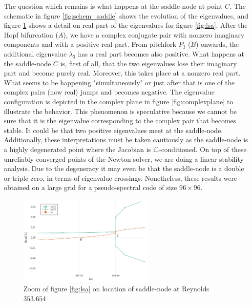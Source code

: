 The question which remains is what happens at the saddle-node at point $C$. The
schematic in figure \ref{fig:schem_saddle} shows the evolution of the
eigenvalues, and figure \ref{fig:lsa_zoom} shows a detail on real part of the
eigenvalues for figure \ref{fig:lsa}. After the Hopf bifurcation ($A$), we have
a complex conjugate pair with nonzero imaginary components and with a positive
real part. From pitchfork $P_3$ ($B$) onwards, the additional eigenvalue
$\lambda_3$ has a real part becomes also positive. What happens at the
saddle-node $C$ is, first of all, that the two eigenvalues lose their imaginary
part and become purely real. Moreover, this takes place at a nonzero real part.
What seems to be happening "simultaneously" or just after that is one of the
complex pairs (now real) jumps and becomes negative. The eigenvalue
configuration is depicted in the complex plane in figure \ref{fig:complexplane}
to illustrate the behavior. This phenomenon is speculative because we cannot be
sure that it is the eigenvalue corresponding to the complex pair that becomes
stable. It could be that two positive eigenvalues meet at the saddle-node.
Additionally, these interpretations must be taken cautiously as the saddle-node
is a highly degenerated point where the Jacobian is ill-conditioned. On top of
these unreliably converged points of the Newton solver, we are doing a linear
stability analysis. Due to the degeneracy it may even be that the saddle-node
is a double or triple zero, in terms of eigenvalue crossings. Nonetheless,
these results were obtained on a large grid for a pseudo-spectral code of size
$96 \times 96$.


\begin{figure}[h!]
  \centering
  \includegraphics[width=0.6\textwidth]{figs/lsa_sn_zoom96x96.pdf}
  \caption{Zoom of figure \ref{fig:lsa} on location of saddle-node at Reynolds $353.654$} 
  \label{fig:lsa_zoom}
\end{figure}

